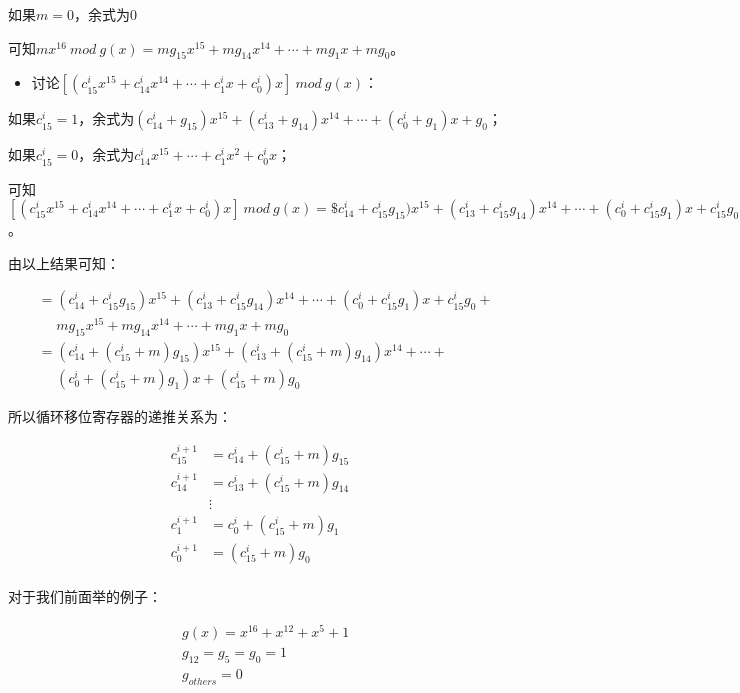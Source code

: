 \documentclass[
]{article}
\begin{document}
如果$m=0$，余式为$0$

可知$mx^{16} \: mod \: g(x) = mg_{15}x^{15}+mg_{14}x^{14}+\cdots+mg_1x+mg_0$。

\begin{itemize}
\item
  讨论$[(c_{15}^ix^{15}+c_{14}^ix^{14}+\cdots+c_1^ix+c_0^i)x] \: mod \: g(x)$：
\end{itemize}

如果$c_{15}^i=1$，余式为$(c_{14}^i+g_{15})x^{15}+(c_{13}^i+g_{14})x^{14}+\cdots+(c_0^i+g_1)x+g_0$；

如果$c_{15}^i=0$，余式为$c_{14}^ix^{15}+\cdots+c_1^ix^2+c_0^ix$；

可知$[(c_{15}^ix^{15}+c_{14}^ix^{14}+\cdots+c_1^ix+c_0^i)x] \: mod \: g(x)=\$c_{14}^i+c_{15}^ig_{15})x^{15}+(c_{13}^i+c_{15}^ig_{14})x^{14}+\cdots+(c_0^i+c_{15}^ig_1)x+c_{15}^ig_0$。

由以上结果可知：

\begin{equation}
\begin{aligned}
&=(c_{14}^i+c_{15}^ig_{15})x^{15}+(c_{13}^i+c_{15}^ig_{14})x^{14}+\cdots+(c_0^i+c_{15}^ig_1)x+c_{15}^ig_0+\\
& \: \: \: \: \: \:  mg_{15}x^{15}+mg_{14}x^{14}+\cdots+mg_1x+mg_0\\
&=(c_{14}^{i}+(c_{15}^i+m)g_{15})x^{15}+(c_{13}^{i}+(c_{15}^i+m)g_{14})x^{14}+\cdots+\\
& \: \: \: \: \: \:  (c_{0}^{i}+(c_{15}^i+m)g_{1})x+(c_{15}^i+m)g_0
\end{aligned}
\end{equation}

所以循环移位寄存器的递推关系为：

\begin{equation}
\begin{aligned}
c_{15}^{i+1}&=c_{14}^{i}+(c_{15}^i+m)g_{15}\\
c_{14}^{i+1}&=c_{13}^{i}+(c_{15}^i+m)g_{14}\\
&\vdots\\
c_{1}^{i+1}&=c_{0}^{i}+(c_{15}^i+m)g_{1}\\
c_{0}^{i+1}&=(c_{15}^i+m)g_{0}\\
\end{aligned}
\end{equation}

对于我们前面举的例子：

\begin{equation}
\begin{aligned}
&g(x)=x^{16}+x^{12}+x^5+1\\
&g_{12}=g_{5}=g_{0}=1\\
&g_{others}=0
\end{aligned}
\end{equation}
\end{document}
